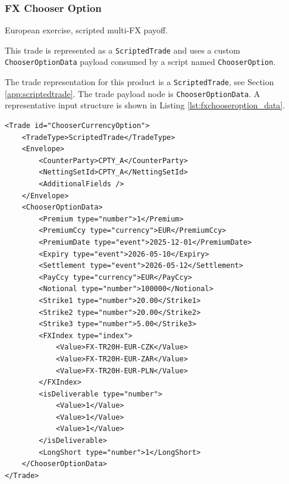 \subsubsection{FX Chooser Option}

\ifdefined{}

\else

European exercise, scripted multi-FX payoff.

This trade is represented as a \lstinline!ScriptedTrade! and uses a custom
\lstinline!ChooserOptionData! payload consumed by a script named \lstinline!ChooserOption!.

\fi

The trade representation for this product is a \lstinline!ScriptedTrade!, see
Section \ref{app:scriptedtrade}. The trade payload node is
\lstinline!ChooserOptionData!. A representative input structure is shown in
Listing \ref{lst:fxchooseroption_data}.

\begin{listing}[H]
\begin{verbatim}
<Trade id="ChooserCurrencyOption">
	<TradeType>ScriptedTrade</TradeType>
	<Envelope>
		<CounterParty>CPTY_A</CounterParty>
		<NettingSetId>CPTY_A</NettingSetId>
		<AdditionalFields />
	</Envelope>
	<ChooserOptionData>
		<Premium type="number">1</Premium>
		<PremiumCcy type="currency">EUR</PremiumCcy>
		<PremiumDate type="event">2025-12-01</PremiumDate>
		<Expiry type="event">2026-05-10</Expiry>
		<Settlement type="event">2026-05-12</Settlement>
		<PayCcy type="currency">EUR</PayCcy>
		<Notional type="number">100000</Notional>
		<Strike1 type="number">20.00</Strike1>
		<Strike2 type="number">20.00</Strike2>
		<Strike3 type="number">5.00</Strike3>
		<FXIndex type="index">
			<Value>FX-TR20H-EUR-CZK</Value>
			<Value>FX-TR20H-EUR-ZAR</Value>
			<Value>FX-TR20H-EUR-PLN</Value>
		</FXIndex>
		<isDeliverable type="number">
			<Value>1</Value>
			<Value>1</Value>
			<Value>1</Value>
		</isDeliverable>
		<LongShort type="number">1</LongShort>
	</ChooserOptionData>
</Trade>
\end{verbatim}
\caption{FX Chooser Option data (scripted representation)}
\label{lst:fxchooseroption_data}
\end{listing}

